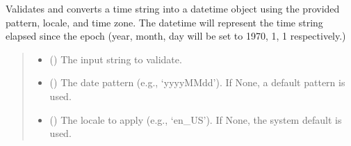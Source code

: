 \documentclass[letterpaper,10pt,english]{sphinxmanual}
\begin{document}
\begin{fulllineitems}
\begin{fulllineitems}
\label{\detokenize{apache_commons_validator_python.routines:apache_commons_validator_python.routines.time_validator.TimeValidator.validate}}
\pysigstartsignatures
{}
\pysigstopsignatures
\sphinxAtStartPar
Validates and converts a time string into a datetime object using the
provided pattern, locale, and time zone. The datetime will represent the time
string elapsed since the epoch (year, month, day will be set to 1970, 1, 1
respectively.)
\begin{quote}\begin{description}
\begin{itemize}
\item {} 
\sphinxAtStartPar
{} () \textendash{} The input string to validate.

\item {} 
\sphinxAtStartPar
{} (\sphinxstyleliteralemphasis{\sphinxupquote{{[}}}\sphinxstyleliteralemphasis{\sphinxupquote{{]}}}) \textendash{} The date pattern (e.g., ‘yyyy\sphinxhyphen{}MM\sphinxhyphen{}dd’). If None, a default pattern is used.

\item {} 
\sphinxAtStartPar
{} (\sphinxstyleliteralemphasis{\sphinxupquote{{[}}}\sphinxstyleliteralemphasis{\sphinxupquote{{]}}}) \textendash{} The locale to apply (e.g., ‘en\_US’). If None, the system default is used.


\end{itemize}
\end{description}
\end{quote}
\end{fulllineitems}
\end{fulllineitems}
\end{document}
